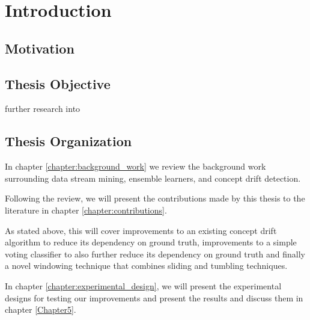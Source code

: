 
\chapter{Introduction\label{chapter:introduction}} %


\newcommand{\keyword}[1]{\textbf{#1}}
\newcommand{\tabhead}[1]{\textbf{#1}}
\newcommand{\code}[1]{\texttt{#1}}
\newcommand{\file}[1]{\texttt{\bfseries#1}}
\newcommand{\option}[1]{\texttt{\itshape#1}}


\section{Motivation}


\section{Thesis Objective}
further research into 


\section{Thesis Organization}

In chapter \ref{chapter:background_work} we review the background work surrounding data stream mining, ensemble learners, and concept drift detection.

Following the review, we will present the contributions made by this thesis to the literature in chapter \ref{chapter:contributions}.

As stated above, this will cover improvements to an existing concept drift algorithm to reduce its dependency on ground truth, improvements to a simple voting classifier to also further reduce its dependency on ground truth and finally a novel windowing technique that combines sliding and tumbling techniques.

In chapter \ref{chapter:experimental_design}, we will present the experimental designs for testing our improvements and present the results and discuss them in chapter \ref{Chapter5}.

